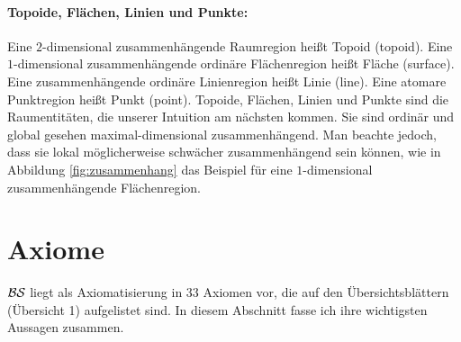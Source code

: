    \paragraph{Topoide, Flächen, Linien und Punkte:}
        Eine
        $2$-dimensional zusammenhängende Raumregion heißt Topoid (topoid).
        Eine $1$-di\-men\-sional zusammenhängende ordinäre Flächenregion heißt Fläche (surface).
        Eine zusammenhängende ordinäre Linienregion heißt Linie (line).
        Eine atomare %
        Punktregion heißt Punkt (point).
        Topoide, Flächen, Linien und Punkte sind die Raumentitäten, die unserer Intuition am nächsten kommen.
        Sie sind ordinär
        und global gesehen maximal-dimensional zusammenhängend.
        Man beachte jedoch, dass sie lokal möglicherweise schwächer zusammenhängend sein können, wie in Abbildung \ref{fig:zusammenhang} das Beispiel für eine $1$-dimensional zusammenhängende Flächenregion.

%
		
    
\section{Axiome}\label{ssec:axiome}
$\mathcal{BS}$ liegt als Axiomatisierung in 33 Axiomen vor, die auf den Übersichtsblättern (Übersicht 1) aufgelistet sind.
In diesem Abschnitt fasse ich ihre wichtigsten Aussagen zusammen.

